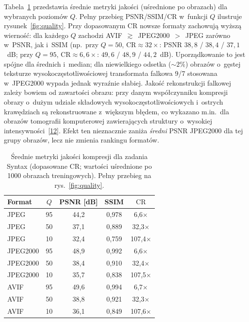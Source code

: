 \documentclass[12pt,a4paper]{article}
\newcommand{\mycite}[1]{\hyperlink{bib#1}{[#1]}}
\begin{document}
Tabela~\ref{tab:quality_metrics} przedstawia średnie metryki jakości (uśrednione po obrazach) dla wybranych poziomów $Q$. Pełny przebieg PSNR/SSIM/CR w~funkcji $Q$ ilustruje rysunek~\ref{fig:quality}. Przy dopasowanym CR nowsze formaty zachowują wyższą wierność: dla każdego $Q$ zachodzi AVIF~$\gtrsim$~JPEG2000~$>$~JPEG zarówno w~PSNR, jak i~SSIM (np.~przy $Q=50$, $\mathrm{CR}\approx 32\times$: PSNR $38{,}8$ / $38{,}4$ / $37{,}1$~dB; przy $Q=95$, $\mathrm{CR}\approx 6{,}6\times$: $49{,}6$ / $48{,}9$ / $44{,}2$~dB). Uporządkowanie to jest spójne dla średnich i~median; dla niewielkiego odsetka (${\sim}2\%$) obrazów o~gęstej teksturze wysokoczęstotliwościowej transformata falkowa 9/7 stosowana w~JPEG2000 wypada jednak wyraźnie słabiej. Jakość rekonstrukcji falkowej zależy bowiem od zawartości obrazu: przy danym współczynniku kompresji obrazy o~dużym udziale składowych wysokoczęstotliwościowych i~ostrych krawędziach są rekonstruowane z~większym błędem, co wykazano m.in.~dla obrazów tomografii komputerowej zawierających struktury o~wysokiej intensywności~\mycite{12}. Efekt ten nieznacznie zaniża \emph{średni} PSNR JPEG2000 dla tej grupy obrazów, lecz nie zmienia rankingu formatów.

\begin{table}[H]
\centering
\caption{Średnie metryki jakości kompresji dla zadania Syntax (dopasowane CR; wartości uśrednione po 1000 obrazach treningowych). Pełny przebieg na rys.~\ref{fig:quality}.}
\label{tab:quality_metrics}
\begin{tabular}{lcccc}
\toprule
Format & $Q$ & PSNR [dB] & SSIM & $\mathrm{CR}$ \\
\midrule
JPEG     & 95 & 44{,}2 & 0{,}978 & 6{,}6$\times$ \\
JPEG     & 50 & 37{,}1 & 0{,}889 & 32{,}3$\times$ \\
JPEG     & 10 & 32{,}4 & 0{,}759 & 107{,}4$\times$ \\
\midrule
JPEG2000 & 95 & 48{,}9 & 0{,}992 & 6{,}6$\times$ \\
JPEG2000 & 50 & 38{,}4 & 0{,}910 & 32{,}4$\times$ \\
JPEG2000 & 10 & 35{,}7 & 0{,}838 & 107{,}5$\times$ \\
\midrule
AVIF     & 95 & 49{,}6 & 0{,}994 & 6{,}7$\times$ \\
AVIF     & 50 & 38{,}8 & 0{,}921 & 32{,}3$\times$ \\
AVIF     & 10 & 36{,}1 & 0{,}849 & 107{,}6$\times$ \\
\bottomrule
\end{tabular}
\end{table}
\end{document}

